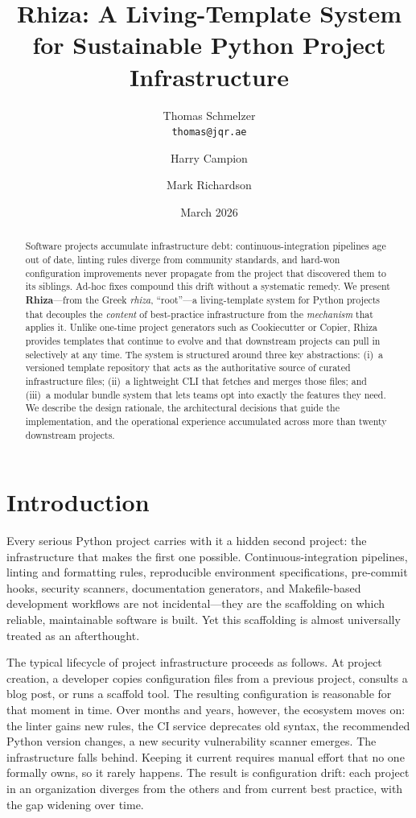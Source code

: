 \documentclass[12pt,a4paper]{article}
\title{\textbf{Rhiza: A Living-Template System for Sustainable Python Project Infrastructure}}
\author{
  Thomas Schmelzer\\
  \texttt{thomas@jqr.ae}
  \and
  Harry Campion
  \and
  Mark Richardson
}
\date{March 2026}
\begin{document}
\maketitle

\begin{abstract}
Software projects accumulate infrastructure debt: continuous-integration pipelines age out of date, linting rules diverge from community standards, and hard-won configuration improvements never propagate from the project that discovered them to its siblings. Ad-hoc fixes compound this drift without a systematic remedy. We present \textbf{Rhiza}---from the Greek \textit{rhiza}, ``root''---a living-template system for Python projects that decouples the \emph{content} of best-practice infrastructure from the \emph{mechanism} that applies it. Unlike one-time project generators such as Cookiecutter or Copier, Rhiza provides templates that continue to evolve and that downstream projects can pull in selectively at any time. The system is structured around three key abstractions: (i)~a versioned template repository that acts as the authoritative source of curated infrastructure files; (ii)~a lightweight CLI that fetches and merges those files; and (iii)~a modular bundle system that lets teams opt into exactly the features they need. We describe the design rationale, the architectural decisions that guide the implementation, and the operational experience accumulated across more than twenty downstream projects.
\end{abstract}

\tableofcontents
\newpage

\section{Introduction}
\label{sec:intro}

Every serious Python project carries with it a hidden second project: the infrastructure that makes the first one possible. Continuous-integration pipelines, linting and formatting rules, reproducible environment specifications, pre-commit hooks, security scanners, documentation generators, and Makefile-based development workflows are not incidental---they are the scaffolding on which reliable, maintainable software is built. Yet this scaffolding is almost universally treated as an afterthought.

The typical lifecycle of project infrastructure proceeds as follows. At project creation, a developer copies configuration files from a previous project, consults a blog post, or runs a scaffold tool. The resulting configuration is reasonable for that moment in time. Over months and years, however, the ecosystem moves on: the linter gains new rules, the CI service deprecates old syntax, the recommended Python version changes, a new security vulnerability scanner emerges. The infrastructure falls behind. Keeping it current requires manual effort that no one formally owns, so it rarely happens. The result is configuration drift: each project in an organization diverges from the others and from current best practice, with the gap widening over time.
\end{document}
